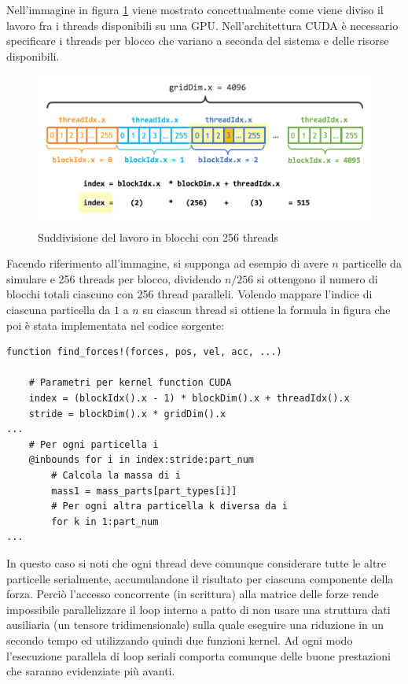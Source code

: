\documentclass[11pt, a4paper]{article}
\begin{document}
Nell'immagine in figura \ref{cudasplit} viene mostrato concettualmente come viene diviso il lavoro fra i threads disponibili su una GPU. Nell'architettura CUDA è necessario specificare i threads per blocco che variano a seconda del sistema e delle risorse disponibili. 
\begin{figure}[ht]
\centering
\includegraphics[width=\textwidth]{images/cudaparal.png}
\caption{Suddivisione del lavoro in blocchi con 256 threads}
\label{cudasplit}
\end{figure}
Facendo riferimento all'immagine, si supponga ad esempio di avere $n$ particelle da simulare e 256 threads per blocco, dividendo $n/256$ si ottengono il numero di blocchi totali ciascuno con 256 thread paralleli. Volendo mappare l'indice di ciascuna particella da $1$ a $n$ su ciascun thread si ottiene la formula in figura che poi è stata implementata nel codice sorgente:
\begin{verbatim}
function find_forces!(forces, pos, vel, acc, ...)
    
    # Parametri per kernel function CUDA
    index = (blockIdx().x - 1) * blockDim().x + threadIdx().x
    stride = blockDim().x * gridDim().x
...
    # Per ogni particella i
    @inbounds for i in index:stride:part_num        
        # Calcola la massa di i
        mass1 = mass_parts[part_types[i]] 
        # Per ogni altra particella k diversa da i
        for k in 1:part_num
...
\end{verbatim}

In questo caso si noti che ogni thread deve comunque considerare tutte le altre particelle serialmente, accumulandone il risultato per ciascuna componente della forza. Perciò l'accesso concorrente (in scrittura) alla matrice delle forze rende impossibile parallelizzare il loop interno a patto di non usare una struttura dati ausiliaria (un tensore tridimensionale) sulla quale eseguire una riduzione in un secondo tempo ed utilizzando quindi due funzioni kernel. Ad ogni modo l'esecuzione parallela di loop seriali comporta comunque delle buone prestazioni che saranno evidenziate più avanti.
\end{document}
